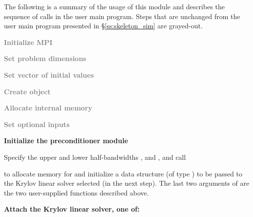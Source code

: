 The following is a summary of the usage of this module and describes the sequence
of calls in the user main program. Steps that are unchanged from the user main
program presented in \S\ref{ss:skeleton_sim} are grayed-out.
\begin{Steps}
\item 
  \textcolor{gray}{\bf Initialize MPI}

\item
  \textcolor{gray}{\bf Set problem dimensions}

\item
  \textcolor{gray}{\bf Set vector of initial values}
 
\item
  \textcolor{gray}{\bf Create {\cvode} object}

\item
  \textcolor{gray}{\bf Allocate internal memory}

\item
  \textcolor{gray}{\bf Set optional inputs}

\item \label{i:bbdpre_init}
  {\bf Initialize the {\cvbbdpre} preconditioner module}

  Specify the upper and lower half-bandwidths ,  and
  ,  and call 


  to allocate memory for and initialize a data structure 
  (of type ) to be passed to the Krylov linear solver selected
  (in the next step). The last two arguments of  are the two
  user-supplied functions described above.

\item \label{i:bbdpre_attach}
  {\bf Attach the Krylov linear solver, one of:}





\end{Steps}

